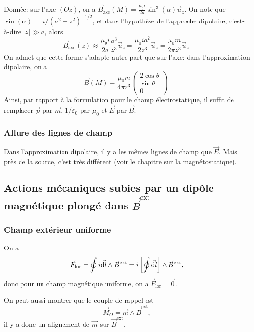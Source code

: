 Donnée: sur l'axe $(Oz)$, on a $\vec{B}_{\mathrm{axe}}(M)=\frac{\mu_0i}{2a}\sin^{3}(\alpha)\vec{u}_z$. On note que $\sin(\alpha)=a/(a^{2}+z^{2})^{-1/2}$, et dans l'hypothèse de l'approche dipolaire, c'est-à-dire $\left\lvert z\right\rvert\gg a$, alors
\begin{equation}
    \vec{B}_{\mathrm{axe}}(z)\approx\frac{\mu_0i}{2a}\frac{a^{3}}{z^{3}}\vec{u}_z=\frac{\mu_0ia^{2}}{2z^{3}}\vec{u}_z=\frac{\mu_0 m}{2\pi z^{3}}\vec{u}_z.
\end{equation}
On admet que cette forme s'adapte autre part que sur l'axe: dans l'approximation dipolaire, on a 
\begin{equation}
    \boxed{
    \vec{B}(M)=\frac{\mu_0 m}{4\pi r^{3}}\begin{pmatrix}
        2\cos\theta\\\sin\theta\\0
    \end{pmatrix}
    .}
\end{equation}
Ainsi, par rapport à la formulation pour le champ électrostatique, il suffit de remplacer $\vec{p}$ par $\vec{m}$, $1/\varepsilon_0$ par $\mu_0$ et $\vec{E}$ par $\vec{B}$.

\subsubsection{Allure des lignes de champ}
Dans l'approximation dipolaire, il y a les mêmes lignes de champ que $\vec{E}$. Mais près de la source, c'est très différent (voir le chapitre sur la magnétostatique).

\subsection{Actions mécaniques subies par un dipôle magnétique plongé dans \texorpdfstring{$\vec{B}^{\mathrm{ext}}$}{B}}
\subsubsection{Champ extérieur uniforme}
On a
\begin{equation}
    \vec{F}_{\mathrm{lor}}=\oint i\vec{\mathrm{d} l}\wedge\vec{B}^{\mathrm{ext}}=i\left[\oint\vec{\mathrm{d} l}\right]\wedge\vec{B}^{\mathrm{ext}},
\end{equation}
donc pour un champ magnétique uniforme, on a $\vec{F}_{\mathrm{lor}}=\vec{0}$.

On peut aussi montrer que le couple de rappel est
\begin{equation}
    \boxed{
        \vec{M}_O=\vec{m}\wedge\vec{B}^{\mathrm{ext}},
    }
\end{equation}
il y a donc un alignement de $\vec{m}$ sur $\vec{B}^{\mathrm{ext}}$.

